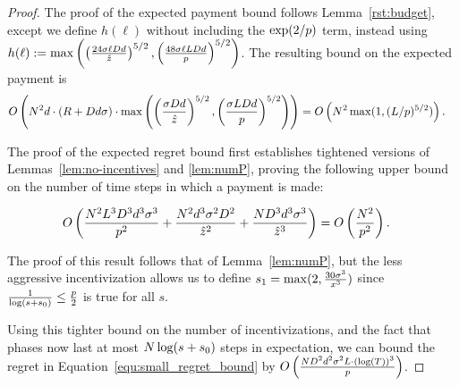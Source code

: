 \begin{proof}
The proof of the expected payment bound follows Lemma~\ref{rst:budget},
except we define $h(\ell)$ without including the $\exp(2/p)$ term,
instead using
$h(\ell) := \max \left(
  \left(\frac{24\sigma \ell D d}{\hat{z}} \right)^{5/2},
  \left( \frac{48\sigma \ell L D d}{p} \right)^{5/2}
\right)$.
The resulting bound on the expected payment is
\begin{align*}
O\left( N^2 d \cdot (R+D d\sigma) \cdot
  \max \left(
    \left(\frac{\sigma D d}{\hat{z}} \right)^{5/2},
    \left( \frac{\sigma L D d}{p} \right)^{5/2}
    \right) \right)
& = O\left(N^2 \max (1, (L/p)^{5/2}) \right).
\end{align*}

The proof of the expected regret bound first establishes tightened versions of Lemmas~\ref{lem:no-incentives} and \ref{lem:numP},
proving the following upper bound on the number of time steps in which a payment is made:
    
\begin{align*}
O\left(\frac{N^2 L^3 D^3 d^3 \sigma^3}{p^2}
    + \frac{N^2 d^3 \sigma^2 D^2}{\hat{z}^2} + \frac{N D^3 d^3 \sigma^3}{\hat{z}^3}
  \right)
& = O \left( \frac{N^2}{p^2} \right).
\end{align*}

The proof of this result follows that of Lemma~\ref{lem:numP},
but the less aggressive incentivization allows us to define
$s_1 = \max(2, \frac{30 \sigma^3}{x^3})$
since $\frac{1}{\log(s+s_0)} \leq \frac{p}{2}$ is true for all $s$.

Using this tighter bound on the number of incentivizations,
and the fact that phases now last at most $N \log(s+s_0)$ steps in expectation,
we can bound the regret in Equation~\eqref{equ:small_regret_bound} by
$O\left(\frac{ND^2 d^2\sigma^2 L \cdot (\log(T))^3}{p}\right)$.
\end{proof}
